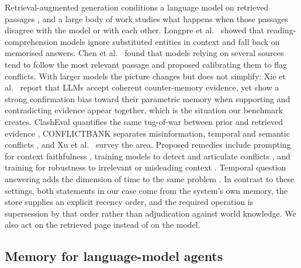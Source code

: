 \documentclass[journal=jcisd8,manuscript=article]{achemso}
\begin{document}
Retrieval-augmented generation conditions a language model on retrieved passages \cite{lewis2020rag,guu2020realm,karpukhin2020dpr,gao2023ragsurvey}, and a large body of work studies what happens when those passages disagree with the model or with each other. Longpre et al.~\cite{longpre2021entity} showed that reading-comprehension models ignore substituted entities in context and fall back on memorised answers. Chen et al.~\cite{chen2022rich} found that models relying on several sources tend to follow the most relevant passage and proposed calibrating them to flag conflicts. With larger models the picture changes but does not simplify: Xie et al.~\cite{xie2024chameleon} report that LLMs accept coherent counter-memory evidence, yet show a strong confirmation bias toward their parametric memory when supporting and contradicting evidence appear together, which is the situation our benchmark creates. ClashEval quantifies the same tug-of-war between prior and retrieved evidence \cite{wu2024clasheval}, CONFLICTBANK separates misinformation, temporal and semantic conflicts \cite{su2024conflictbank}, and Xu et al.~\cite{xu2024conflictsurvey} survey the area. Proposed remedies include prompting for context faithfulness \cite{zhou2023contextfaithful}, training models to detect and articulate conflicts \cite{wang2024resolving}, and training for robustness to irrelevant or misleading context \cite{shi2023distracted,yoran2024robust,chen2024rgb}. Temporal question answering adds the dimension of time to the same problem \cite{dhingra2022timeaware,zhang2021situatedqa,kasai2023realtimeqa}. In contrast to these settings, both statements in our case come from the system's own memory, the store supplies an explicit recency order, and the required operation is supersession by that order rather than adjudication against world knowledge. We also act on the retrieved page instead of on the model.

\subsection{Memory for language-model agents}
\end{document}
